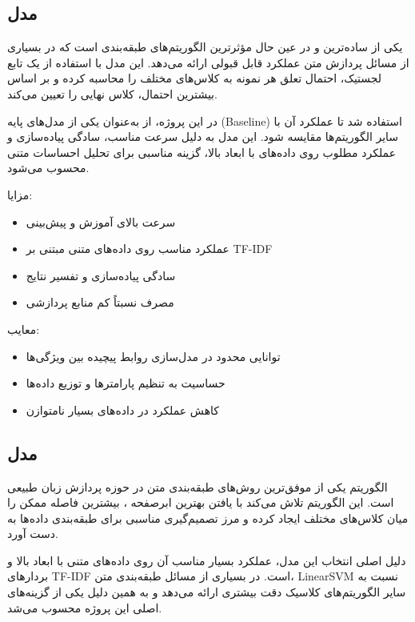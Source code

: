 \subsection{مدل }
 یکی از ساده‌ترین و در عین حال مؤثرترین الگوریتم‌های طبقه‌بندی است که در بسیاری از مسائل پردازش متن عملکرد قابل قبولی ارائه می‌دهد. این مدل با استفاده از یک تابع لجستیک، احتمال تعلق هر نمونه به کلاس‌های مختلف را محاسبه کرده و بر اساس بیشترین احتمال، کلاس نهایی را تعیین می‌کند.

در این پروژه، از  به‌عنوان یکی از مدل‌های پایه (Baseline) استفاده شد تا عملکرد آن با سایر الگوریتم‌ها مقایسه شود. این مدل به دلیل سرعت مناسب، سادگی پیاده‌سازی و عملکرد مطلوب روی داده‌های با ابعاد بالا، گزینه مناسبی برای تحلیل احساسات متنی محسوب می‌شود.

مزایا:
\begin{itemize}
	\item سرعت بالای آموزش و پیش‌بینی
	\item عملکرد مناسب روی داده‌های متنی مبتنی بر TF-IDF
	\item سادگی پیاده‌سازی و تفسیر نتایج
	\item مصرف نسبتاً کم منابع پردازشی
\end{itemize}
معایب:
\begin{itemize}
	\item توانایی محدود در مدل‌سازی روابط پیچیده بین ویژگی‌ها
	\item حساسیت به تنظیم پارامترها و توزیع داده‌ها
	\item کاهش عملکرد در داده‌های بسیار نامتوازن
\end{itemize}



\subsection{مدل }
الگوریتم  یکی از موفق‌ترین روش‌های طبقه‌بندی متن در حوزه پردازش زبان طبیعی است. این الگوریتم تلاش می‌کند با یافتن بهترین ابرصفحه  ، بیشترین فاصله ممکن را میان کلاس‌های مختلف ایجاد کرده و مرز تصمیم‌گیری مناسبی برای طبقه‌بندی داده‌ها به دست آورد.

دلیل اصلی انتخاب این مدل، عملکرد بسیار مناسب آن روی داده‌های متنی با ابعاد بالا و بردارهای TF-IDF است. در بسیاری از مسائل طبقه‌بندی متن، LinearSVM نسبت به سایر الگوریتم‌های کلاسیک دقت بیشتری ارائه می‌دهد و به همین دلیل یکی از گزینه‌های اصلی این پروژه محسوب می‌شد.

